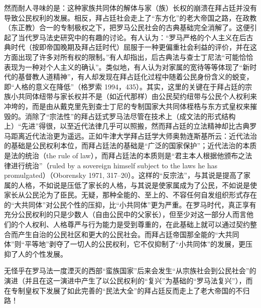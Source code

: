 \documentclass[a4paper,12pt,punct=kaiming,fontset=none]{ctexart}
\begin{document}
然而耐人寻味的是：这种家族共同体的解体与家（族）长权的崩溃在拜占廷并没有导致公民权利的发展。相反，拜占廷社会走上了“东方化”的老大帝国之路，在政教（东正教）合一的专制极权之下，把罗马公民社会的古典基础完全消解了。这便引起了当代罗马法史研究中的有趣的讨论。有人认为：“罗马严格的个人主义在后古典时代（按即帝国晚期及拜占廷时代）屈服于一种更偏重社会利益的评价，并在这方面出现了许多对所有权的限制。”有人却指出，后古典法与查士丁尼法“可能恰恰表现为一种对个人主义的确认”。类似地，有人认为对家属的宽待等等体现了“新时代的基督教人道精神”，有人却发现在拜占廷化过程中随着公民身份含义的蜕变，即“人格的意义在降低”（格罗索 1994，435）。其实，这里的关键在于拜占廷的宗族小共同体纽带与家长权并不是（如近代那样）由公民契约纽带与公民个人权利来冲垮的，而是由从戴克里先到查士丁尼的专制国家大共同体桎梏与东方式皇权来摧毁的。消除了“宗法性”的拜占廷式罗马法尽管在技术上（成文法的形式结构上）“先进”得很，以至近代法律几乎可以照搬，然而拜占廷的立法精神却比古典罗马距离近代法治更为遥远。正如牛津大学拜占廷学大师奥勃连斯基所云：近代法治的基础是公民权利本位，而拜占廷法的基础是“广泛的国家保护”；近代法治的本质是法的统治（the rule of law），而拜占廷法的本质则是“君主本人根据他颁布之法律进行统治”（ruled by a sovereign himself subject to the laws he has promulgated）（Oborensky 1971, 317–20）。这样的“反宗法”，与其说是提高了家属的人格，不如说是压低了家长的人格，与其说是使家属成为了公民，不如说是使家长从公民沦为了臣民。无疑，那种全能的、至上的、不容任何自发组织形式存在的“大共同体”对公民个性的压抑，比“小共同体”更为严重。在罗马时代，真正享有充分公民权利的只是少数人（自由公民中的父家长），但至少对这一部分人而言他们的个人权利、人格尊严与行为能力是受到尊重的，在此基础上就可以通过契约整合而产生自治的公民社区和更大的公民社会。而拜占廷帝国那全能的“大共同体”则“平等地”剥夺了一切人的公民权利，它不仅抑制了“小共同体”的发展，更压抑了人的个性发展。

无怪乎在罗马法一度湮灭的西部“蛮族国家”后来会发生“从宗族社会到公民社会”的演进（并且在这一演进中产生了以公民权利的“复兴”为基础的“罗马法复兴”），而在专制皇权下发展了如此完善的“民法大全”的拜占廷反而走上了老大帝国的不归路！
\end{document}
